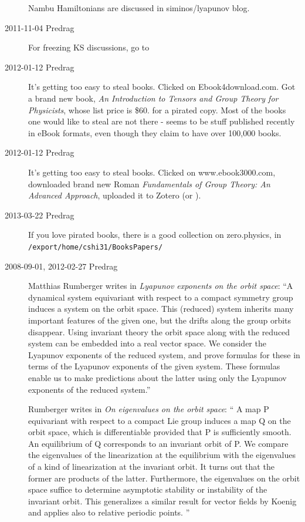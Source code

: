 \begin{description}
Nambu Hamiltonians are discussed in siminos/lyapunov blog.

\item[2011-11-04 Predrag] For freezing KS discussions, go to

\item[2012-01-12 Predrag] It's getting too easy to steal books. Clicked on
{Ebook4download.com}. Got a brand new book, {\em An
Introduction to Tensors and Group Theory for Physicists}, whose list
price is \$60. 
for a pirated copy. Most of the books one would like to steal are not
there - seems to be stuff published recently in eBook formats, even though
they claim to have over 100,000 books.

\item[2012-01-12 Predrag] It's getting too easy to steal books. Clicked
on
{www.ebook3000.com}, downloaded brand new Roman {\em
Fundamentals of Group Theory: An Advanced Approach}, uploaded it to
Zotero (or ).

\item[2013-03-22 Predrag]
If you love pirated books, there is a good collection on zero.physics, in
\texttt{/export/home/cshi31/BooksPapers/}

\item[2008-09-01, 2012-02-27 Predrag]
{Matthias Rumberger} writes in
{\emph{Lyapunov exponents on the orbit space}}:
``A dynamical system equivariant with respect to a compact symmetry
group induces a system on the orbit space. This (reduced) system
inherits many important features of the given one, but the drifts along the
group orbits disappear. Using invariant theory the orbit space along with the
reduced system can be embedded into a real vector space. We consider the
Lyapunov exponents of the reduced system, and prove formulas for these in
terms of the Lyapunov exponents of the given system. These formulas enable
us to make predictions about the latter using only the Lyapunov exponents of
the reduced system.''

Rumberger writes in
\emph{On eigenvalues on the orbit space}: ``
A map P equivariant with respect to a compact Lie group induces a map Q
on the orbit space, which is differentiable provided that P is
sufficiently smooth. An equilibrium of Q corresponds to an invariant
orbit of P. We compare the eigenvalues of the linearization at the
equilibrium with the eigenvalues of a kind of linearization at the
invariant orbit. It turns out that the former are products of the latter.
Furthermore, the eigenvalues on the orbit space suffice to determine
asymptotic stability or instability of the invariant orbit. This
generalizes a similar result for vector fields by Koenig
and applies also to relative periodic points.
''


\end{description}
